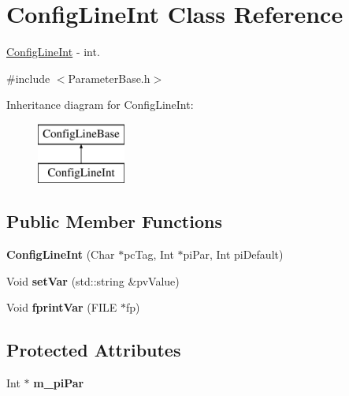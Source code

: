 \hypertarget{class_config_line_int}{}\section{Config\+Line\+Int Class Reference}
\label{class_config_line_int}


\hyperlink{class_config_line_int}{Config\+Line\+Int} -\/ int.  




{\ttfamily \#include $<$Parameter\+Base.\+h$>$}

Inheritance diagram for Config\+Line\+Int\+:\begin{figure}[H]
\begin{center}
\leavevmode
\includegraphics[height=2.000000cm]{class_config_line_int}
\end{center}
\end{figure}
\subsection*{Public Member Functions}
\begin{DoxyCompactItemize}
\item 
\mbox{\label{class_config_line_int_a4a7466645545cb00f1282a4f3a5e9429}} 
{\bfseries Config\+Line\+Int} (Char $\ast$pc\+Tag, Int $\ast$pi\+Par, Int pi\+Default)
\item 
\mbox{\label{class_config_line_int_a1d293b80d590c528ee1b801c5b995cd4}} 
Void {\bfseries set\+Var} (std\+::string \&pv\+Value)
\item 
\mbox{\label{class_config_line_int_a7722943f58ef7c3ec975d4d71ece57b8}} 
Void {\bfseries fprint\+Var} (F\+I\+LE $\ast$fp)
\end{DoxyCompactItemize}
\subsection*{Protected Attributes}
\begin{DoxyCompactItemize}
\item 
\mbox{\label{class_config_line_int_ab7e7e040885db64935da23543086b8a5}} 
Int $\ast$ {\bfseries m\+\_\+pi\+Par}
\end{DoxyCompactItemize}
